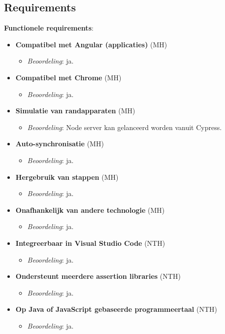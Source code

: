 \subsection{Requirements}

\textbf{Functionele requirements}:
\begin{itemize}
	\item \textbf{Compatibel met Angular (applicaties)} (MH)
	\begin{itemize}
		\item \emph{Beoordeling}: ja.
	\end{itemize}
	\item \textbf{Compatibel met Chrome} (MH)
	\begin{itemize}
		\item \emph{Beoordeling}: ja.
	\end{itemize}
	\item \textbf{Simulatie van randapparaten} (MH)
	\begin{itemize}
		\item \emph{Beoordeling}: Node server kan gelanceerd worden vanuit Cypress.
	\end{itemize}
	\item \textbf{Auto-synchronisatie} (MH)
	\begin{itemize}
		\item \emph{Beoordeling}: ja.
	\end{itemize}
	\item \textbf{Hergebruik van stappen} (MH)
	\begin{itemize}
		\item \emph{Beoordeling}: ja.
	\end{itemize}
	\item \textbf{Onafhankelijk van andere technologie} (MH)
	\begin{itemize}
		\item \emph{Beoordeling}: ja.
	\end{itemize}
	\item \textbf{Integreerbaar in Visual Studio Code} (NTH)
	\begin{itemize}
		\item \emph{Beoordeling}: ja.
	\end{itemize}
	\item \textbf{Ondersteunt meerdere assertion libraries} (NTH)
	\begin{itemize}
		\item \emph{Beoordeling}: ja.
	\end{itemize}
	\item \textbf{Op Java of JavaScript gebaseerde programmeertaal} (NTH)
	\begin{itemize}
		\item \emph{Beoordeling}: ja.
	\end{itemize}
\end{itemize}

